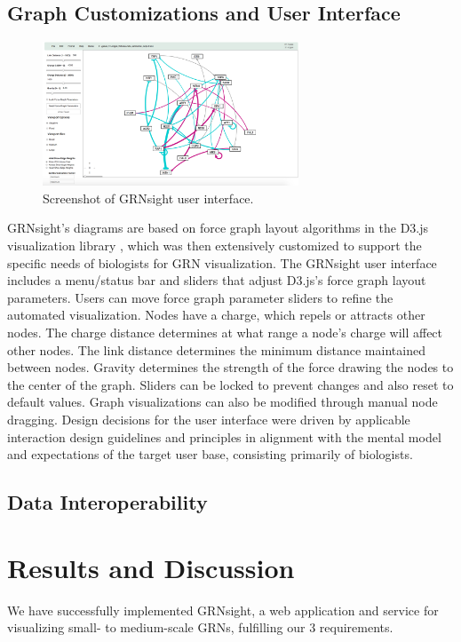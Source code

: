 \documentclass[sigconf,review,anonymous]{acmart}
\begin{document}
\subsection{Graph Customizations and User Interface}
\begin{figure}[ht]
  \centering
  \includegraphics[width=3.0in]{screenshot.png}
  \caption{Screenshot of GRNsight user interface.}
  \label{fig:Screenshot}
\end{figure}
GRNsight's diagrams are based on force graph layout algorithms in the D3.js visualization library \cite{d3}, which was then extensively customized to support the specific needs of biologists for GRN visualization. The GRNsight user interface includes a menu/status bar and sliders that adjust D3.js's force graph layout parameters. Users can move force graph parameter sliders to refine the automated visualization. Nodes have a charge, which repels or attracts other nodes. The charge distance determines at what range a node's charge will affect other nodes. The link distance determines the minimum distance maintained between nodes. Gravity determines the strength of the force drawing the nodes to the center of the graph. Sliders can be locked to prevent changes and also reset to default values. Graph visualizations can also be modified through manual node dragging. Design decisions for the user interface were driven by applicable interaction design guidelines and principles \cite{norman2013design,shneiderman2010designing,nielsen1994usability} in alignment with the mental model and expectations of the target user base, consisting primarily of biologists.

\subsection{Data Interoperability}


\section{Results and Discussion}
We have successfully implemented GRNsight, a web application and service for visualizing small- to medium-scale GRNs, fulfilling our 3 requirements.
\end{document}
